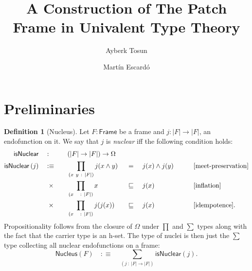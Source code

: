 \documentclass[11pt,a4paper]{article}
\title{A Construction of The Patch Frame in Univalent Type Theory}
\author{Ayberk Tosun \and Mart\'{i}n Escard\'{o}}
\theoremstyle{definition}
\newtheorem{defn}{Definition}
\newcommand{\is}{:\equiv}
\newcommand{\framenm}{\mathsf{Frame}}
\newcommand{\isnuclearnm}{\mathsf{isNuclear}}
\newcommand{\isnuclear}[1]{\isnuclearnm{}\left(#1\right)}
\newcommand{\nucleus}{\mathsf{Nucleus}}
\newcommand{\abs}[1]{\left| #1 \right|}
\newcommand{\hprop}{\Omega}
\newcommand{\meet}[2]{#1 \wedge #2}
\newcommand{\pity}[3]{\prod_{(#1~:~#2)} #3}
\newcommand{\sigmaty}[3]{\sum_{(#1~:~#2)} #3}
\begin{document}
\maketitle

\begin{abstract}
\end{abstract}

\section{Preliminaries}

\begin{defn}[Nucleus]\label{defn:nucleus}
  Let $F : \framenm{}$ be a frame and $j : \abs{F} \rightarrow \abs{F}$, an endofunction
  on it. We say that $j$ is \emph{nuclear} iff the following condition holds:
  \begin{alignat*}{5}
    \isnuclearnm{}\quad&:\quad &&(\abs{F} \rightarrow \abs{F}) \rightarrow \hprop{} && && &&              \\
    \isnuclear{j} \quad&\is\quad
       &&\pity{x~y}{\abs{F}}{j(\meet{x}{y}) &&~=~ &&\meet{j(x)}{j(y)}}   &&\qquad[\text{meet-preservation}]\\
      &\hspace{0.5em}\times\quad &&\pity{x~~}{\abs{F}}{x &&~\sqsubseteq~ &&j(x)}            &&\qquad[\text{inflation}]  \\
      &\hspace{0.5em}\times\quad &&\pity{x~~}{\abs{F}}{j(j(x)) &&~\sqsubseteq~ &&j(x)}      &&\qquad[\text{idempotence}].
  \end{alignat*}
  Propositionality follows from the closure of $\Omega$ under $\prod$ and $\sum$ types along
  with the fact that the carrier type is an h-set. The type of nuclei is then
  just the $\sum$ type collecting all nuclear endofunctions on a frame:
  \begin{equation*}
    \nucleus{}(F) \quad\is\quad \sigmaty{j}{\abs{F} \rightarrow \abs{F}}{\isnuclear{j}}.
  \end{equation*}
\end{defn}
\printbibliography
\end{document}
